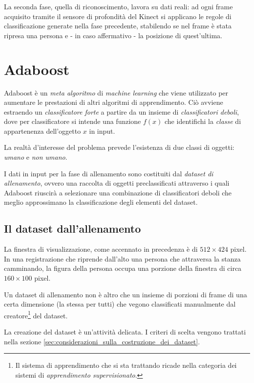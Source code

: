 \documentclass[a4paper,11pt,oneside]{article}
\begin{document}
			La seconda fase, quella di riconoscimento, lavora su dati reali: ad ogni frame acquisito tramite il sensore di profondità del Kinect si applicano le regole di classificazione generate nella fase precedente, stabilendo se nel frame è stata ripresa una persona e - in caso affermativo - la posizione di quest'ultima.


	\section{Adaboost} %
	\label{sec:adaboost}
		Adaboost è un \emph{meta algoritmo} di \emph{machine learning} che viene utilizzato per aumentare le prestazioni di altri algoritmi di apprendimento. Ciò avviene estraendo un \emph{classificatore forte} a partire da un insieme di \emph{classificatori deboli}, dove per classificatore si intende una funzione $f(x)$ che identifichi la \emph{classe} di appartenenza dell'oggetto $x$ in input.

		La realtà d'interesse del problema prevede l'esistenza di due classi di oggetti: \emph{umano} e \emph{non umano}.

		I dati in input per la fase di allenamento sono costituiti dal \emph{dataset di allenamento}, ovvero una raccolta di oggetti preclassificati attraverso i quali Adaboost riuscirà a selezionare una combinazione di classificatori deboli che meglio approssimano la classificazione degli elementi del dataset.

		\subsection{Il dataset dall'allenamento} %
		\label{sub:il_dataset_dall_allenamento}
			La finestra di visualizzazione, come accennato in precedenza è di $512 \times 424$ pixel. In una registrazione che riprende dall'alto una persona che attraversa la stanza camminando, la figura della persona occupa una porzione della finestra di circa $160 \times 100$ pixel.

			Un dataset di allenamento non è altro che un insieme di porzioni di frame di una certa dimensione (la stessa per tutti) che vegono classificati manualmente dal creatore\footnote{Il sistema di apprendimento che si sta trattando ricade nella categoria dei sistemi di \emph{apprendimento supervisionato}.} del dataset.

			La creazione del dataset è un'attività delicata. I criteri di scelta vengono trattati nella sezione \ref{sec:considerazioni_sulla_costruzione_dei_dataset}.
\end{document}
